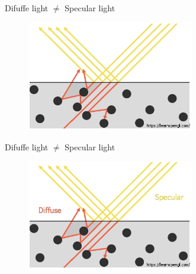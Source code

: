 \documentclass[]{beamer}
\begin{document}

\begin{frame}


  \textcolor{mypink1}{Difuffe light $\neq$ Specular light} 
\vspace{5mm}

\begin{figure}[h!]
  \begin{center}
    \includegraphics[height=1.9in]{images/15.jpg}
  \end{center}
\end{figure}



\end{frame}


\begin{frame}


  \textcolor{mypink1}{Difuffe light $\neq$ Specular light} 
\vspace{5mm}

\begin{figure}[h!]
  \begin{center}
    \includegraphics[height=1.9in]{images/16.jpg}
  \end{center}
\end{figure}



\end{frame}

\end{document}
